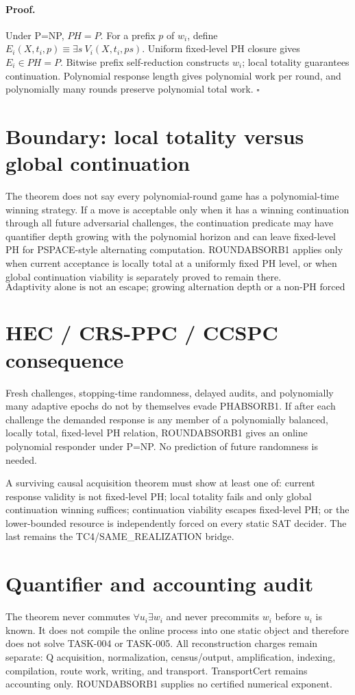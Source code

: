 \documentclass[11pt]{article}
\begin{document}
\paragraph{Proof.} Under P=NP, $PH=P$. For a prefix $p$ of $w_i$, define $E_i(X,t_i,p)\equiv\exists s\ V_i(X,t_i,ps)$. Uniform fixed-level PH closure gives $E_i\in PH=P$. Bitwise prefix self-reduction constructs $w_i$; local totality guarantees continuation. Polynomial response length gives polynomial work per round, and polynomially many rounds preserve polynomial total work. \hfill$\square$

\section*{Boundary: local totality versus global continuation}
The theorem does not say every polynomial-round game has a polynomial-time winning strategy. If a move is acceptable only when it has a winning continuation through all future adversarial challenges, the continuation predicate may have quantifier depth growing with the polynomial horizon and can leave fixed-level PH for PSPACE-style alternating computation. ROUNDABSORB1 applies only when current acceptance is locally total at a uniformly fixed PH level, or when global continuation viability is separately proved to remain there.
\[
\boxed{\text{Adaptivity alone is not an escape; growing alternation depth or a non-PH forced resource might be.}}
\]

\section*{HEC / CRS-PPC / CCSPC consequence}
Fresh challenges, stopping-time randomness, delayed audits, and polynomially many adaptive epochs do not by themselves evade PHABSORB1. If after each challenge the demanded response is any member of a polynomially balanced, locally total, fixed-level PH relation, ROUNDABSORB1 gives an online polynomial responder under P=NP. No prediction of future randomness is needed.

A surviving causal acquisition theorem must show at least one of: current response validity is not fixed-level PH; local totality fails and only global continuation winning suffices; continuation viability escapes fixed-level PH; or the lower-bounded resource is independently forced on every static SAT decider. The last remains the TC4/SAME\_REALIZATION bridge.

\section*{Quantifier and accounting audit}
The theorem never commutes $\forall u_i\exists w_i$ and never precommits $w_i$ before $u_i$ is known. It does not compile the online process into one static object and therefore does not solve TASK-004 or TASK-005. All reconstruction charges remain separate: Q acquisition, normalization, census/output, amplification, indexing, compilation, route work, writing, and transport. TransportCert remains accounting only. ROUNDABSORB1 supplies no certified numerical exponent.
\end{document}
